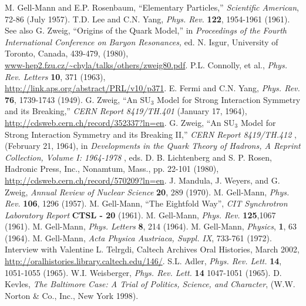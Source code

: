 \documentclass[12pt]{article}
\begin{document}
\begin{thebibliography}{9} 
M. Gell-Mann and E.P. Rosenbaum, ``Elementary Particles,'' {\it Scientific American}, 72-86 (July 1957).
T.D. Lee and C.N. Yang, {\it Phys. Rev.} {\bf122}, 1954-1961 (1961).
See also G. Zweig, ``Origins of the Quark Model,'' in {\it Proceedings of the Fourth International Conference on Baryon Resonances,}
ed. N. Isgur, University of Toronto, Canada, 439-479, (1980),\\
\url{www-hep2.fzu.cz/~chyla/talks/others/zweig80.pdf}.
P.L. Connolly, et al., {\it Phys. Rev. Letters} {\bf 10}, 371 (1963),\\
\url{http://link.aps.org/abstract/PRL/v10/p371}.
E. Fermi and C.N. Yang, {\it Phys. Rev.} {\bf76}, 1739-1743 (1949).
G. Zweig, ``An SU$_{3}$ Model for Strong Interaction Symmetry and its Breaking,'' {\it CERN Report 8419/TH.401} (January 17, 1964),\\
\url{http://cdsweb.cern.ch/record/352337?ln=en}.
G. Zweig, ``An SU$_{3}$ Model for Strong Interaction Symmetry and its Breaking II,'' {\it CERN Report 8419/TH.412 }, (February 21, 1964), in
{\it Developments in the Quark Theory of Hadrons, A Reprint Collection, Volume I: 1964-1978 }, eds. D. B. Lichtenberg and S. P. Rosen, Hadronic Press, Inc., Nonamtum, Mass., pp. 22-101 (1980),\\
\url{http://cdsweb.cern.ch/record/570209?ln=en}.
J. Mandula, J. Weyers, and G. Zweig, {\it Annual Review of Nuclear Science} {\bf 20}, 289 (1970).
M. Gell-Mann,  {\it Phys. Rev.} {\bf 106}, 1296 (1957).
M. Gell-Mann, ``The Eightfold Way'', {\it CIT Synchrotron Laboratory Report} {\bf CTSL - 20} (1961).
M. Gell-Mann, {\it Phys. Rev.} {\bf 125},1067 (1961).
M. Gell-Mann, {\it Phys. Letters} {\bf 8},  214 (1964).
M. Gell-Mann, {\it Physics}, {\bf 1}, 63 (1964).
M. Gell-Mann, {\it Acta Physica Austriaca, Suppl. IX}, 733-761 (1972).
Interview with Valentine L. Telrgdi, Caltech Archives Oral Histories, March 2002,\\
\url{http://oralhistories.library.caltech.edu/146/}.
S.L. Adler, {\it Phys. Rev. Lett.} {\bf 14}, 1051-1055 (1965).
W.I. Weisberger, {\it Phys. Rev. Lett.} {\bf 14} 1047-1051 (1965).
D. Kevles, {\it The Baltimore Case: A Trial of Politics, Science, and Character}, (W.W. Norton \& Co., Inc., New York 1998).
 
\end{thebibliography}
\end{document}
